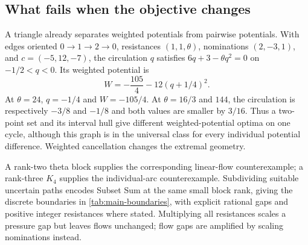 \subsection{What fails when the objective changes}

A triangle already separates weighted potentials from pairwise
potentials. With edges oriented $0\to1\to2\to0$, resistances
$(1,1,\theta)$, nominations $(2,-3,1)$, and
$c=(-5,12,-7)$, the circulation $q$ satisfies
$6q+3-\theta q^2=0$ on $-1/2<q<0$. Its weighted potential is
\[
 W=-\frac{105}{4}-12(q+1/4)^2.
\]
At $\theta=24$, $q=-1/4$ and $W=-105/4$. At
$\theta=16/3$ and $144$, the circulation is respectively $-3/8$ and
$-1/8$ and both values are smaller by $3/16$. Thus a two-point set
and its interval hull give different weighted-potential optima on one
cycle, although this graph is in the universal class for every
individual potential difference. Weighted cancellation changes the
extremal geometry.

A rank-two theta block supplies the corresponding linear-flow
counterexample; a rank-three $K_4$ supplies the individual-arc
counterexample. Subdividing suitable uncertain paths encodes Subset
Sum at the same small block rank, giving the discrete boundaries in
\cref{tab:main-boundaries}, with explicit rational gaps and positive
integer resistances where stated. Multiplying all resistances scales a
pressure gap but leaves flows unchanged; flow gaps are amplified by
scaling nominations instead.

